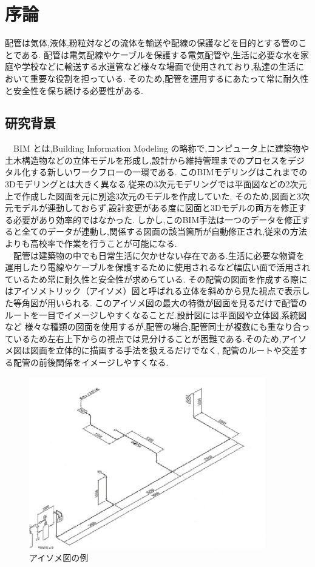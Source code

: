 \chapter{%
序論}

配管は気体,液体,粉粒対などの流体を輸送や配線の保護などを目的とする管のことである.
配管は電気配線やケーブルを保護する電気配管や,生活に必要な水を家庭や学校などに輸送する水道管など様々な場面で使用されており,私達の生活において重要な役割を担っている.
そのため,配管を運用するにあたって常に耐久性と安全性を保ち続ける必要性がある. \\

\section{研究背景}
　BIM とは,Building Information Modeling の略称で,コンピュータ上に建築物や土木構造物などの立体モデルを形成し,設計から維持管理までのプロセスをデジタル化する新しいワークフローの一環である.
このBIMモデリングはこれまでの3Dモデリングとは大きく異なる.従来の3次元モデリングでは平面図などの2次元上で作成した図面を元に別途3次元のモデルを作成していた.
そのため,図面と3次元モデルが連動しておらず,設計変更がある度に図面と3Dモデルの両方を修正する必要があり効率的ではなかった.
しかし,このBIM手法は一つのデータを修正すると全てのデータが連動し,関係する図面の該当箇所が自動修正され,従来の方法よりも高校率で作業を行うことが可能になる.\\
　配管は建築物の中でも日常生活に欠かせない存在である.生活に必要な物資を運用したり電線やケーブルを保護するために使用されるなど幅広い面で活用されているため常に耐久性と安全性が求めらている.
その配管の図面を作成する際にはアイソメトリック（アイソメ）図と呼ばれる立体を斜めから見た視点で表示した等角図が用いられる.
このアイソメ図の最大の特徴が図面を見るだけで配管のルートを一目でイメージしやすくなることだ.設計図には平面図や立体図,系統図など
様々な種類の図面を使用するが,配管の場合,配管同士が複数にも重なり合っているため左右上下からの視点では見分けることが困難である.そのため,アイソメ図は図面を立体的に描画する手法を扱えるだけでなく,
配管のルートや交差する配管の前後関係をイメージしやすくなる.\\
\begin{figure}[htbt]
	\centering
	 \includegraphics[height=75mm]{Figure/ex_iso.eps}
	 \caption{アイソメ図の例}
	 \label{fig:f1}
\end{figure}

